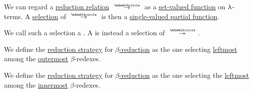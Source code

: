 \begin{definition}\label{def:reduction_strategy}
  We can regard a \hyperref[def:lambda_term_reduction]{reduction relation} \( {\pred} \) as a \hyperref[def:set_valued_map]{set-valued function} on \( \mathrm{\lambda} \)-terms. A \hyperref[def:function/selection]{selection} of \( {\pred} \) is then a \hyperref[def:set_valued_map/partial]{single-valued partial function}.

  We call such a selection a . A  is instead a selection of \( {\pred*} \).
\end{definition}

\begin{definition}\label{def:normal_order_reduction}
  We define the  \hyperref[def:reduction_strategy]{reduction strategy} for \hyperref[def:beta_eta_reduction]{\( \beta \)-reduction} as the one selecting \hyperref[def:subterm_occurrence_ordering/horizontal]{leftmost} among the \hyperref[def:subterm_occurrence_ordering/vertical]{outermost} \( \beta \)-redexes.
\end{definition}

\begin{definition}\label{def:applicative_order_reduction}
  We define the  \hyperref[def:reduction_strategy]{reduction strategy} for \hyperref[def:beta_eta_reduction]{\( \beta \)-reduction} as the one selecting the \hyperref[def:subterm_occurrence_ordering/horizontal]{leftmost} among the \hyperref[def:subterm_occurrence_ordering/vertical]{innermost} \( \beta \)-redexes.
\end{definition}

